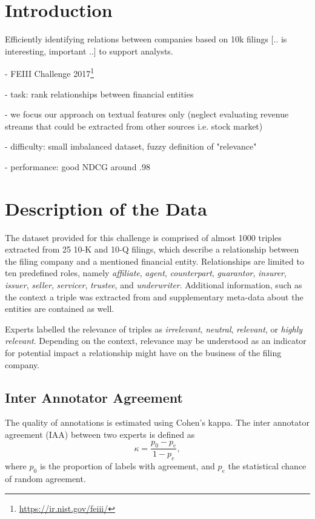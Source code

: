 \section{Introduction}
Efficiently identifying relations between companies based on 10k filings [.. is interesting, important ..] to support analysts.

- FEIII Challenge 2017\footnote{\url{https://ir.nist.gov/feiii/}}

- task: rank relationships between financial entities

- we focus our approach on textual features only (neglect evaluating revenue streams that could be extracted from other sources i.e. stock market)

- difficulty: small imbalanced dataset, fuzzy definition of "relevance"

- performance: good NDCG around .98


\section{Description of the Data}
The dataset provided for this challenge is comprised of almost 1000 triples extracted from 25 10-K and 10-Q filings, which describe a relationship between the filing company and a mentioned financial entity. Relationships are limited to ten predefined roles, namely \textit{affiliate}, \textit{agent}, \textit{counterpart}, \textit{guarantor}, \textit{insurer}, \textit{issuer}, \textit{seller}, \textit{servicer}, \textit{trustee}, and \textit{underwriter}. Additional information, such as the context a triple was extracted from and supplementary meta-data about the entities are contained as well.

Experts labelled the relevance of triples as \textit{irrelevant}, \textit{neutral}, \textit{relevant}, or \textit{highly relevant}. Depending on the context, relevance may be understood as an indicator for potential impact a relationship might have on the business of the filing company. 


\subsection{Inter Annotator Agreement}
The quality of annotations is estimated using Cohen's kappa. The inter annotator agreement (IAA) between two experts is defined as
$$
\kappa = \frac{p_0-p_e}{1-p_e},
$$
where $p_0$ is the proportion of labels with agreement, and $p_e$ the statistical chance of random agreement.

